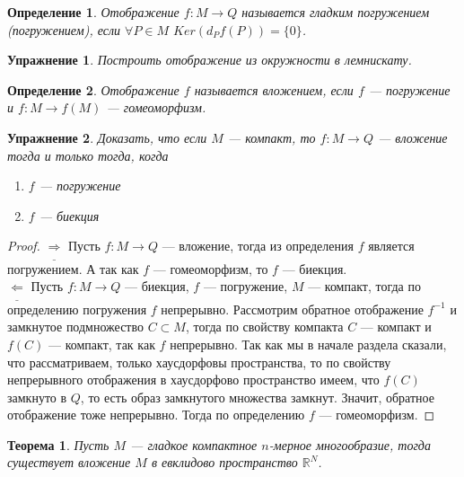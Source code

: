 \documentclass[12pt]{article}
\theoremstyle{plain}
\newtheorem{theorem}{Теорема}[section]
\newtheorem*{exercise}{Упражнение}
\newtheorem{definition}{Определение}[section]
\newcommand{\R}{\mathbb R}
\begin{document}
    \begin{definition}
        Отображение $f:M\to Q$ называется гладким погружением (погружением), если $\forall P\in M$ $Ker(d_Pf(P))=\{0\}$.
    \end{definition}
    \begin{exercise}
        Построить отображение из окружности в лемнискату.
    \end{exercise}
    \begin{definition}
        Отображение $f$ называется вложением, если $f$ --- погружение и $f:M\to f(M)$ --- гомеоморфизм.
    \end{definition}
    \begin{exercise}
        Доказать, что если $M$ --- компакт, то $f:M\to Q$ --- вложение тогда и только тогда, когда
        \begin{enumerate}
            \item $f$ --- погружение
            \item $f$ --- биекция
        \end{enumerate}
    \end{exercise}
    \begin{proof}
        $\underline{\Longrightarrow}$ Пусть $f:M\to Q$ --- вложение, тогда из определения $f$ является погружением. А так как $f$ --- гомеоморфизм, то $f$ --- биекция.\\
        $\underline{\Longleftarrow}$ Пусть $f:M\to Q$ --- биекция, $f$ --- погружение, $M$ --- компакт, тогда по определению погружения $f$ непрерывно. Рассмотрим обратное отображение $f^{-1}$ и замкнутое подмножество $C\subset M$, тогда по свойству компакта $C$ --- компакт и $f(C)$ --- компакт, так как $f$ непрерывно. Так как мы в начале раздела сказали, что рассматриваем, только хаусдорфовы пространства, то по свойству непрерывного отображения в хаусдорфово пространство имеем, что $f(C)$ замкнуто в $Q$, то есть образ замкнутого множества замкнут. Значит, обратное отображение тоже непрерывно. Тогда по определению $f$ --- гомеоморфизм.
    \end{proof}
    \begin{theorem}
        Пусть $M$ --- гладкое компактное $n$-мерное многообразие, тогда существует вложение $M$ в евклидово пространство $\R^N$.
    \end{theorem}
\end{document}
